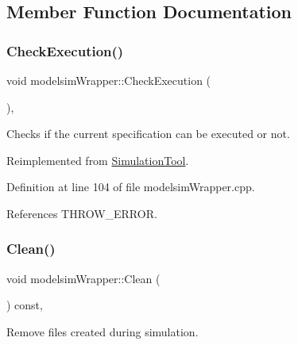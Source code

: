 \subsection{Member Function Documentation}
\mbox{\label{classmodelsimWrapper_a79d1a35dffbeaa4787958acb7d2632ed}} 
\subsubsection{\texorpdfstring{Check\+Execution()}{CheckExecution()}}
{\footnotesize\ttfamily void modelsim\+Wrapper\+::\+Check\+Execution (\begin{DoxyParamCaption}{ }\end{DoxyParamCaption})\hspace{0.3cm}{\ttfamily [override]}, {\ttfamily [virtual]}}



Checks if the current specification can be executed or not. 



Reimplemented from \hyperlink{classSimulationTool_a24b4cde0b09c7496918d20f3896989b6}{Simulation\+Tool}.



Definition at line 104 of file modelsim\+Wrapper.\+cpp.



References T\+H\+R\+O\+W\+\_\+\+E\+R\+R\+OR.

\mbox{\label{classmodelsimWrapper_a835022e305a7b22a8b62486558cf7542}} 
\subsubsection{\texorpdfstring{Clean()}{Clean()}}
{\footnotesize\ttfamily void modelsim\+Wrapper\+::\+Clean (\begin{DoxyParamCaption}{ }\end{DoxyParamCaption}) const\hspace{0.3cm}{\ttfamily [override]}, {\ttfamily [virtual]}}



Remove files created during simulation. 




